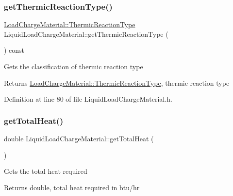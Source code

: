 \subsubsection{\texorpdfstring{get\+Thermic\+Reaction\+Type()}{getThermicReactionType()}\hspace{0.1cm}{\footnotesize\ttfamily [3/3]}}
{\footnotesize\ttfamily \hyperlink{class_load_charge_material_a51d4263e865a5d86236622dd3fe23fd1}{Load\+Charge\+Material\+::\+Thermic\+Reaction\+Type} Liquid\+Load\+Charge\+Material\+::get\+Thermic\+Reaction\+Type (\begin{DoxyParamCaption}{ }\end{DoxyParamCaption}) const\hspace{0.3cm}{\ttfamily [inline]}}

Gets the classification of thermic reaction type \begin{DoxyReturn}{Returns}
\hyperlink{class_load_charge_material_a51d4263e865a5d86236622dd3fe23fd1}{Load\+Charge\+Material\+::\+Thermic\+Reaction\+Type}, thermic reaction type 
\end{DoxyReturn}


Definition at line 80 of file Liquid\+Load\+Charge\+Material.\+h.

\mbox{\label{class_liquid_load_charge_material_a51a9826325e2c34cd073b8766331d476}} 
\subsubsection{\texorpdfstring{get\+Total\+Heat()}{getTotalHeat()}\hspace{0.1cm}{\footnotesize\ttfamily [1/3]}}
{\footnotesize\ttfamily double Liquid\+Load\+Charge\+Material\+::get\+Total\+Heat (\begin{DoxyParamCaption}{ }\end{DoxyParamCaption})}

Gets the total heat required

\begin{DoxyReturn}{Returns}
double, total heat required in btu/hr 
\end{DoxyReturn}
\mbox{\label{class_liquid_load_charge_material_a51a9826325e2c34cd073b8766331d476}} 
